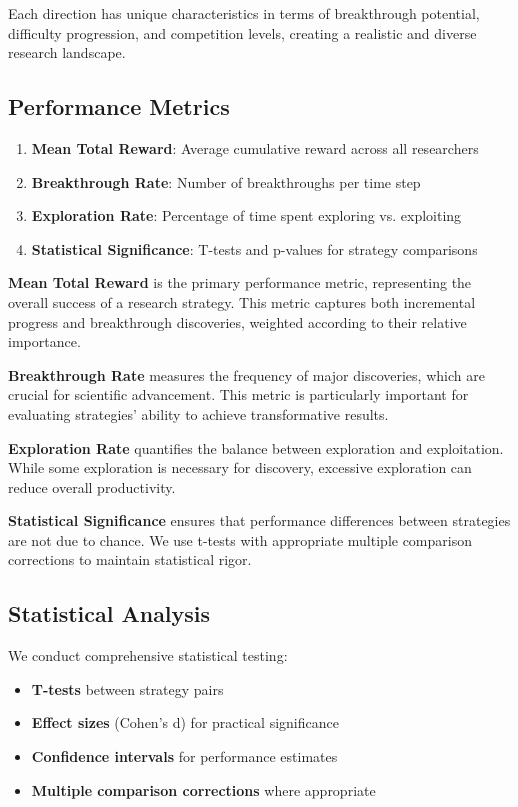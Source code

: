\documentclass[letterpaper]{article} %
\begin{document}
Each direction has unique characteristics in terms of breakthrough potential, difficulty progression, and competition levels, creating a realistic and diverse research landscape.

\subsection{Performance Metrics}

\begin{enumerate}
\item \textbf{Mean Total Reward}: Average cumulative reward across all researchers
\item \textbf{Breakthrough Rate}: Number of breakthroughs per time step
\item \textbf{Exploration Rate}: Percentage of time spent exploring vs. exploiting
\item \textbf{Statistical Significance}: T-tests and p-values for strategy comparisons
\end{enumerate}

\textbf{Mean Total Reward} is the primary performance metric, representing the overall success of a research strategy. This metric captures both incremental progress and breakthrough discoveries, weighted according to their relative importance.

\textbf{Breakthrough Rate} measures the frequency of major discoveries, which are crucial for scientific advancement. This metric is particularly important for evaluating strategies' ability to achieve transformative results.

\textbf{Exploration Rate} quantifies the balance between exploration and exploitation. While some exploration is necessary for discovery, excessive exploration can reduce overall productivity.

\textbf{Statistical Significance} ensures that performance differences between strategies are not due to chance. We use t-tests with appropriate multiple comparison corrections to maintain statistical rigor.

\subsection{Statistical Analysis}

We conduct comprehensive statistical testing:
\begin{itemize}
\item \textbf{T-tests} between strategy pairs
\item \textbf{Effect sizes} (Cohen's d) for practical significance
\item \textbf{Confidence intervals} for performance estimates
\item \textbf{Multiple comparison corrections} where appropriate
\end{itemize}
\end{document}
